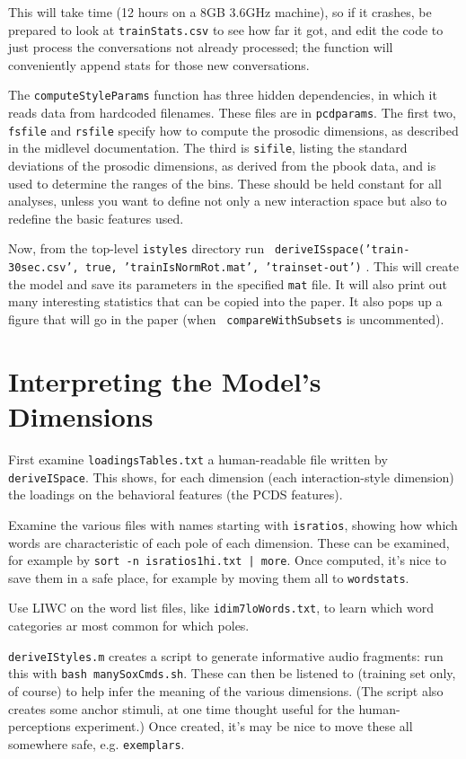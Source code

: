 \documentclass[11pt]{article}
\begin{document}
This will take time (12 hours on a 8GB 3.6GHz machine), so if it crashes,
be prepared to look at {\tt trainStats.csv} to see how far it got, and
edit the code to just process the conversations not already processed;
the function will conveniently append stats for those new
conversations.

The {\tt computeStyleParams} function has three hidden dependencies,
in which it reads data from hardcoded filenames.  These files are in
{\tt pcdparams}.  The first two, {\tt fsfile} and {\tt rsfile} specify
how to compute the prosodic dimensions, as described in the midlevel
documentation. The third is {\tt sifile}, listing the standard
deviations of the prosodic dimensions, as derived from the pbook data,
and is used to determine the ranges of the bins.  These should be held
constant for all analyses, unless you want to define not only a new
interaction space but also to redefine the basic features used.

\medskip
Now, from the top-level {\tt istyles} directory run {\tt
  deriveISspace('train-30sec.csv', true, 'trainIsNormRot.mat',
  'trainset-out')} .  This will create the
model and save its parameters in the specified {\tt mat} file. It will
also print out many interesting statistics that can be copied into the
paper.  It also pops up a figure that will go in the paper (when {\tt
  compareWithSubsets} is uncommented).


\section{Interpreting the Model's Dimensions}

First examine {\tt loadingsTables.txt} a human-readable file written
by {\tt deriveISpace}.  This shows, for each dimension (each
interaction-style dimension) the loadings on the behavioral features
(the PCDS features).

Examine the various files with names starting with {\tt isratios},
showing how which words are characteristic of each pole of each
dimension.  These can be examined, for example by {\tt sort -n
  isratios1hi.txt | more}.  Once computed, it's nice to save them in a
safe place, for example by moving them all to {\tt wordstats}.

Use LIWC on the word list files, like {\tt idim7loWords.txt}, to learn
which word categories ar most common for which poles.

{\tt deriveIStyles.m} creates a script to generate informative audio
fragments: run this with {\tt bash manySoxCmds.sh}.  These can then be
listened to (training set only, of course) to help infer the meaning
of the various dimensions.  (The script also creates some anchor
stimuli, at one time thought useful for the human-perceptions
experiment.)  Once created, it's may be nice to move these all
somewhere safe, e.g. {\tt exemplars}.
\end{document}
